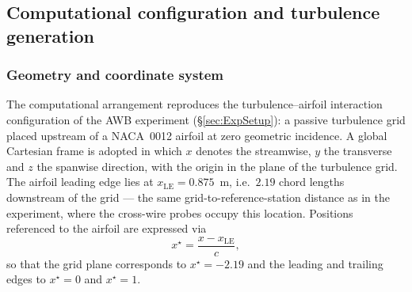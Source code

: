\documentclass[lineno]{JFM-FLM_Au}
\begin{document}
\newpage
%

\subsection{Computational configuration and turbulence generation}
\label{sec:method_configuration}

\subsubsection{Geometry and coordinate system}

The computational arrangement reproduces the turbulence--airfoil
interaction configuration of the AWB experiment
(\S\ref{sec:ExpSetup}): a passive turbulence grid placed upstream of a
NACA~0012 airfoil at zero geometric incidence. A global Cartesian
frame is adopted in which $x$ denotes the streamwise, $y$ the
transverse and $z$ the spanwise direction, with the origin in the
plane of the turbulence grid. The airfoil leading edge lies at
$x_{\mathrm{LE}} = 0.875$~m, i.e.\ $2.19$ chord lengths downstream of
the grid --- the same grid-to-reference-station distance as in the
experiment, where the cross-wire probes occupy this location.
Positions referenced to the airfoil are expressed via
\begin{equation}
  x^{\star} = \frac{x - x_{\mathrm{LE}}}{c},
  \label{eq:xstar_def}
\end{equation}
so that the grid plane corresponds to $x^{\star} = -2.19$ and the
leading and trailing edges to $x^{\star} = 0$ and $x^{\star} = 1$.
\end{document}
